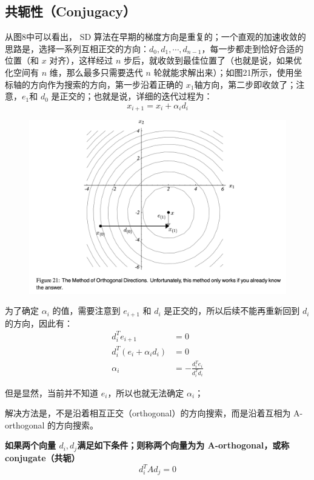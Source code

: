 \documentclass[12pt]{article}
\begin{document}
\subsection{共轭性（Conjugacy）}
从图8中可以看出， SD 算法在早期的梯度方向是重复的；一个直观的加速收敛的思路是，选择一系列互相正交的方向：$d_0, d_1, \cdots, d_{n-1}$，每一步都走到恰好合适的位置（和 $x$ 对齐），这样经过 $n$ 步后，就收敛到最佳位置了（也就是说，如果优化空间有 $n$ 维，那么最多只需要迭代 $n$ 轮就能求解出来）；如图21所示，使用坐标轴的方向作为搜索的方向，第一步沿着正确的 $x_1$轴方向，第二步即收敛了；注意，$e_1$和 $d_0$ 是正交的；也就是说，详细的迭代过程为：
$$
x_{i+1} = x_i + \alpha_i d_i
$$

\begin{figure}[H]
    \centering
    \includegraphics[width=1\textwidth]{fig/CG_Convergence_CD_1.png}
\end{figure}

为了确定 $\alpha_i$ 的值，需要注意到 $e_{i+1}$ 和 $d_i$ 是正交的，所以后续不能再重新回到 $d_i$ 的方向，因此有：
\begin{align*}
d^T_i e_{i+1} &= 0 \\
d^T_i(e_i + \alpha_i d_i) &= 0 \\
\alpha_i &= -\frac{d^T_ie_i}{d^T_id_i}
\end{align*}

但是显然，当前并不知道 $e_i$，所以也就无法确定 $\alpha_i$；

解决方法是，不是沿着相互正交（orthogonal）的方向搜索，而是沿着互相为 A-orthogonal 的方向搜索。

\textbf{如果两个向量 $d_i, d_j$满足如下条件；则称两个向量为为 A-orthogonal，或称 conjugate（共轭）}
$$
d_i^TAd_j = 0
$$
\end{document}
